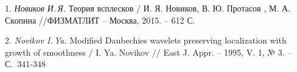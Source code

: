 \litlist

1. {\it Новиков И.\,Я.} Теория всплесков /  И. Я. Новиков, В. Ю. Протасов , М. А. Скопина
//ФИЗМАТЛИТ -- Москва, 2015. -- 612 С.

2. {\it Novikov I.\,Ya.} Modified Daubechies wavelets preserving localization with growth of smoothness / I. Ya. Novikov
// East J. Appr. -- 1995, V. 1, № 3. -- С.~341-348
